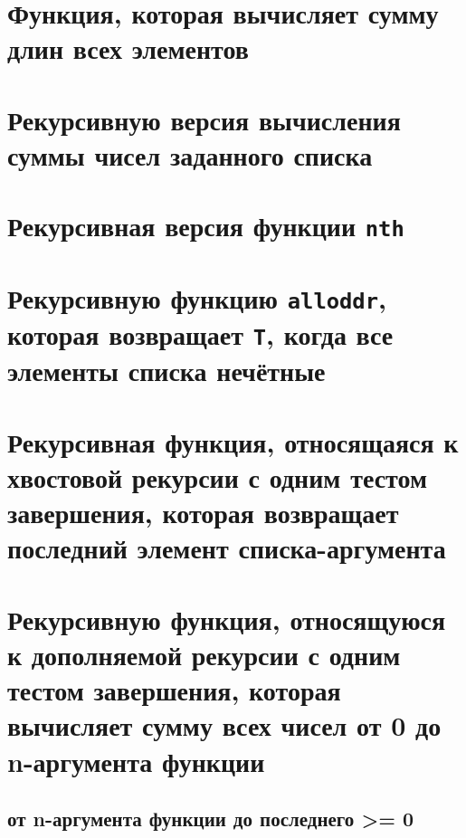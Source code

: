 \section{Функция, которая вычисляет сумму длин всех элементов}




\section{Рекурсивную версия вычисления суммы чисел заданного списка}




\section{Рекурсивная версия функции \texttt{nth}}




\section{Рекурсивную функцию  \texttt{alloddr}, которая возвращает \texttt{T}, когда все элементы списка нечётные}




\section{Рекурсивная  функция, относящаяся к хвостовой рекурсии с одним тестом завершения, которая возвращает последний элемент списка-аргумента}




\section{Рекурсивную  функция, относящуюся  к  дополняемой рекурсии с одним тестом завершения, которая вычисляет сумму всех чисел от 0 до n-аргумента функции}

\subsection{от n-аргумента функции до последнего >= 0}

